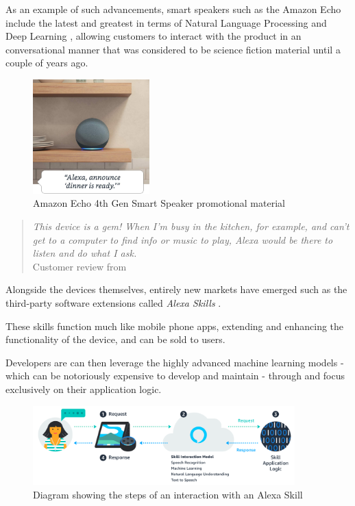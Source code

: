 \documentclass[openright]{normas-utf-tex} %
\begin{document}
As an example of such advancements, smart speakers such as the Amazon Echo \cite{GaoPanWangChen2018} include the latest and greatest
in terms of Natural Language Processing and Deep Learning \cite{Young2018}, allowing customers to interact with the product in an conversational manner
that was considered to be science fiction material until a couple of years ago.

\begin{figure}[!htb]
	\centering
	\includegraphics[width=0.4\textwidth]{./images/echodot4.jpg} %
	\caption[Amazon Echo 4th Generation smart speaker promotional material]{Amazon Echo 4th Gen Smart Speaker promotional material}
	\label{fig:echodot4}
\end{figure}

\begin{quote}
    \textit{This device is a gem! When I’m busy in the kitchen, for example, and can’t get
    to a computer to find info or music to play, Alexa would be there to listen
    and do what I ask.} \\
    Customer review from \cite{GaoPanWangChen2018}
\end{quote}

Alongside the devices themselves, entirely new markets have emerged such as the third-party software extensions
called \textit{Alexa Skills} \cite{Alexa2022}.

These skills function much like mobile phone apps, extending and enhancing the functionality of the device, and
can be sold to users.

Developers are can then leverage the highly advanced machine learning models - which can be notoriously expensive to develop 
and maintain \cite{Phdata2021} - through  and focus exclusively on their application logic.

\begin{figure}[htb!]
	\centering
	\includegraphics[width=0.9\textwidth]{./images/skills.png} %
	\caption[Diagram showing the steps of an interaction with an Alexa Skill]{Diagram showing the steps of an interaction with an Alexa Skill}
	\label{fig:alexaskill}
\end{figure}
\end{document}
